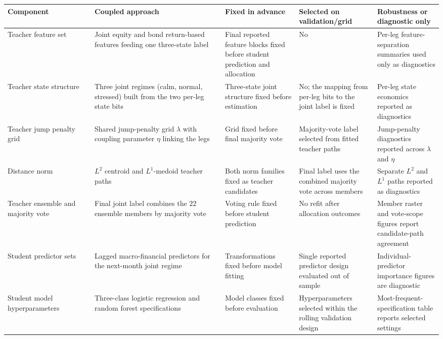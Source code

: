 \begin{table}[p]
\centering
\footnotesize
\setlength{\tabcolsep}{4pt}
\renewcommand{\arraystretch}{1.05}
\begin{adjustbox}{center,max width=\linewidth}
\begin{tabular}{p{0.20\linewidth}p{0.30\linewidth}p{0.17\linewidth}p{0.18\linewidth}p{0.18\linewidth}}
\toprule
Component & Coupled approach & Fixed in advance & Selected on validation/grid & Robustness or diagnostic only \\
\midrule
Teacher feature set & Joint equity and bond return-based features feeding one three-state label & Final reported feature blocks fixed before student prediction and allocation & No & Per-leg feature-separation summaries used only as diagnostics \\
Teacher state structure & Three joint regimes (calm, normal, stressed) built from the two per-leg state bits & Three-state joint structure fixed before estimation & No; the mapping from per-leg bits to the joint label is fixed & Per-leg state economics reported as diagnostics \\
Teacher jump penalty grid & Shared jump-penalty grid $\lambda$ with coupling parameter $\eta$ linking the legs & Grid fixed before final majority vote & Majority-vote label selected from fitted teacher paths & Jump-penalty diagnostics reported across $\lambda$ and $\eta$ \\
Distance norm & $L^2$ centroid and $L^1$-medoid teacher paths & Both norm families fixed as teacher candidates & Final label uses the combined majority vote across members & Separate $L^2$ and $L^1$ paths reported as diagnostics \\
Teacher ensemble and majority vote & Final joint label combines the $22$ ensemble members by majority vote & Voting rule fixed before student prediction & No refit after allocation outcomes & Member raster and vote-scope figures report candidate-path agreement \\
Student predictor sets & Lagged macro-financial predictors for the next-month joint regime & Transformations fixed before model fitting & Single reported predictor design evaluated out of sample & Individual-predictor importance figures are diagnostic \\
Student model hyperparameters & Three-class logistic regression and random forest specifications & Model classes fixed before evaluation & Hyperparameters selected within the rolling validation design & Most-frequent-specification table reports selected settings \\

\end{tabular}
\end{adjustbox}
\end{table}
